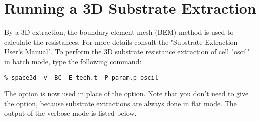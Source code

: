 \section{Running a 3D Substrate Extraction}
By a 3D extraction, the boundary element mesh (BEM) method is used to calculate the resistances.
For more details consult the "Substrate Extraction User's Manual".
To perform the 3D substrate resistance extraction of cell "oscil" in batch mode,
type the following command:
\small
\begin{Verbatim}
% space3d -v -BC -E tech.t -P param.p oscil
\end{Verbatim}
\normalsize
The  option is now used in place of the  option.
Note that you don't need to give the  option,
because substrate extractions are always done in flat mode.
The output of the verbose mode is listed below.

